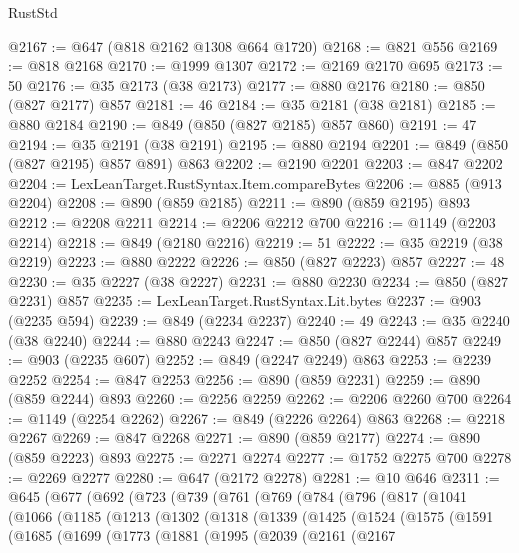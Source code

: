 \begin{lexlean}{RustStd}
\begin{coremodule}
@2167 := @647 (@818 @2162 @1308 @664 @1720)
@2168 := @821 @556
@2169 := @818 @2168
@2170 := @1999 @1307
@2172 := @2169 @2170 @695
@2173 := 50
@2176 := @35 @2173 (@38 @2173)
@2177 := @880 @2176
@2180 := @850 (@827 @2177) @857
@2181 := 46
@2184 := @35 @2181 (@38 @2181)
@2185 := @880 @2184
@2190 := @849 (@850 (@827 @2185) @857 @860)
@2191 := 47
@2194 := @35 @2191 (@38 @2191)
@2195 := @880 @2194
@2201 := @849 (@850 (@827 @2195) @857 @891) @863
@2202 := @2190 @2201
@2203 := @847 @2202
@2204 := LexLeanTarget.RustSyntax.Item.compareBytes
@2206 := @885 (@913 @2204)
@2208 := @890 (@859 @2185)
@2211 := @890 (@859 @2195) @893
@2212 := @2208 @2211
@2214 := @2206 @2212 @700
@2216 := @1149 (@2203 @2214)
@2218 := @849 (@2180 @2216)
@2219 := 51
@2222 := @35 @2219 (@38 @2219)
@2223 := @880 @2222
@2226 := @850 (@827 @2223) @857
@2227 := 48
@2230 := @35 @2227 (@38 @2227)
@2231 := @880 @2230
@2234 := @850 (@827 @2231) @857
@2235 := LexLeanTarget.RustSyntax.Lit.bytes
@2237 := @903 (@2235 @594)
@2239 := @849 (@2234 @2237)
@2240 := 49
@2243 := @35 @2240 (@38 @2240)
@2244 := @880 @2243
@2247 := @850 (@827 @2244) @857
@2249 := @903 (@2235 @607)
@2252 := @849 (@2247 @2249) @863
@2253 := @2239 @2252
@2254 := @847 @2253
@2256 := @890 (@859 @2231)
@2259 := @890 (@859 @2244) @893
@2260 := @2256 @2259
@2262 := @2206 @2260 @700
@2264 := @1149 (@2254 @2262)
@2267 := @849 (@2226 @2264) @863
@2268 := @2218 @2267
@2269 := @847 @2268
@2271 := @890 (@859 @2177)
@2274 := @890 (@859 @2223) @893
@2275 := @2271 @2274
@2277 := @1752 @2275 @700
@2278 := @2269 @2277
@2280 := @647 (@2172 @2278)
@2281 := @10 @646
@2311 := @645
    (@677
      (@692
        (@723
          (@739
            (@761
              (@769
                (@784
                  (@796
                    (@817
                      (@1041
                        (@1066
                          (@1185
                            (@1213
                              (@1302
                                (@1318
                                  (@1339
                                    (@1425
                                      (@1524
                                        (@1575
                                          (@1591
                                            (@1685
                                              (@1699
                                                (@1773
                                                  (@1881
                                                    (@1995
                                                      (@2039
                                                        (@2161
                                                          (@2167

\end{coremodule}
\end{lexlean}
